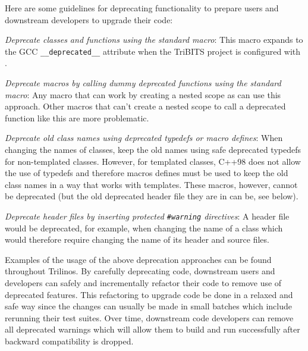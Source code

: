 \documentclass[11pt]{SANDreport}
\begin{document}
Here are some guidelines for deprecating functionality to prepare
users and downstream developers to upgrade their code:

\begin{compactitem}

{}\item\textit{Deprecate classes and functions using the standard
{} macro}: This macro expands to the
GCC {}\texttt{\_\_deprecated\_\_} attribute when the TriBITS project
is configured with {}.

{}\item\textit{Deprecate macros by calling dummy deprecated functions
using the standard {} macro}: Any
macro that can work by creating a nested scope as {} can use this approach.  Other macros
that can't create a nested scope to call a deprecated function like
this are more problematic.

{}\item\textit{Deprecate old class names using deprecated typedefs or
macro defines}: When changing the names of classes, keep the old names
using safe deprecated typedefs for non-templated classes.  However,
for templated classes, C++98 does not allow the use of typedefs and
therefore macros defines must be used to keep the old class names in a
way that works with templates.  These macros, however, cannot be
deprecated (but the old deprecated header file they are in can be, see
below).

{}\item\textit{Deprecate header files by inserting protected
{}\texttt{\#warning} directives}: A header file would be deprecated,
for example, when changing the name of a class which would therefore
require changing the name of its header and source files.

\end{compactitem}

Examples of the usage of the above deprecation approaches can be found
throughout Trilinos.  By carefully deprecating code, downstream users
and developers can safely and incrementally refactor their code to
remove use of deprecated features.  This refactoring to upgrade code
be done in a relaxed and safe way since the changes can usually be
made in small batches which include rerunning their test suites.  Over
time, downstream code developers can remove all deprecated warnings
which will allow them to build and run successfully after backward
compatibility is dropped.
\end{document}
